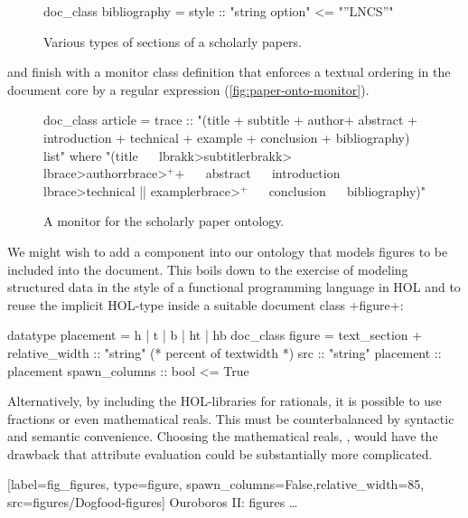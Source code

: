 \begin{isabellebody}
\begin{isamarkuptext}
\begin{figure}
\begin{isar}
doc_class bibliography =
   style :: "string option"  <=  "''LNCS''"
\end{isar}
\caption{Various types of sections of a scholarly papers.}
\label{fig:paper-onto-sections}
\end{figure}
 and finish with a monitor class definition that enforces a textual ordering
in the document core by a regular expression (\autoref{fig:paper-onto-monitor}).
\begin{figure}
\begin{isar}
doc_class article = 
   trace :: "(title + subtitle + author+ abstract +
              introduction + technical + example +
              conclusion + bibliography) list"
   where "(title       ~~ \<lbrakk>subtitle\<rbrakk>   ~~ \<lbrace>author\<rbrace>$^+$+  ~~  abstract    ~~
             introduction ~~  \<lbrace>technical || example\<rbrace>$^+$  ~~  conclusion ~~  
             bibliography)"
\end{isar}
\caption{A monitor for the scholarly paper ontology.}
\label{fig:paper-onto-monitor}
\end{figure}%
\end{isamarkuptext}\isamarkuptrue%
%
\begin{isamarkuptext}%
We might wish to add a component into our ontology that models figures to be included into 
the document. This boils down to the exercise of modeling structured data in the style of a 
functional programming language in HOL and to reuse the implicit HOL-type inside a suitable document 
class \inlineisar+figure+:
\begin{isar}
datatype placement = h | t | b | ht | hb   
doc_class figure   = text_section +
   relative_width   :: "string" (* percent of textwidth *)    
   src     :: "string"
   placement :: placement 
   spawn_columns :: bool <= True 
\end{isar}%
\end{isamarkuptext}\isamarkuptrue%
%
\begin{isamarkuptext}%
Alternatively, by including the HOL-libraries for rationals, it is possible to 
use fractions or even mathematical reals. This must be counterbalanced by syntactic 
and semantic convenience. Choosing the mathematical reals, \eg, would have the drawback that 
attribute evaluation could be substantially more complicated.%
\end{isamarkuptext}\isamarkuptrue%
%
\isaDofFigure%
%
[label={fig_figures}, type={figure}, spawn_columns=False,relative_width={85},
      src={figures/Dogfood-figures}]%
{Ouroboros II: figures \ldots}%

\end{isabellebody}
